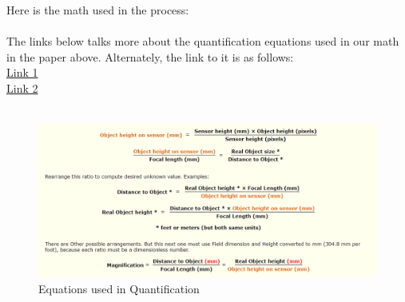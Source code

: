 Here is the math used in the process:\\
\\
The links below talks more about the quantification equations used in our math in the paper above. 
Alternately, the link to it is as follows:\\
\href{https://petapixel.com/2013/06/15/a-mathematical-look-at-focal-length-and-crop-factor/}{Link 1}\\
\href{https://www.scantips.com/lights/fieldofviewmath.html}{Link 2}
\\
\\
\begin{figure}[!hb]
   

   \includegraphics[scale=0.5]{images/MATH.PNG}

 
   \caption{Equations used in Quantification}\label{fig:GINIdataset}
\end{figure}
